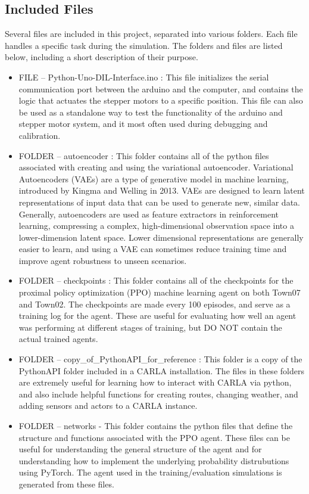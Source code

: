 \documentclass[12pt,oneside,letterpaper]{article}
\begin{document}
\subsection{Included Files}
Several files are included in this project, separated into various folders. Each file handles a specific task during the simulation. The folders and files are listed below, including a short description of their purpose.
\begin{itemize}
\item FILE -- Python-Uno-DIL-Interface.ino : This file initializes the serial communication port between the arduino and the computer, and contains the logic that actuates the stepper motors to a specific position. This file can also be used as a standalone way to test the functionality of the arduino and stepper motor system, and it most often used during debugging and calibration.
\item FOLDER -- autoencoder : This folder contains all of the python files associated with creating and using the variational autoencoder. Variational Autoencoders (VAEs) are a type of generative model in machine learning, introduced by Kingma and Welling in 2013. VAEs are designed to learn latent representations of input data that can be used to generate new, similar data. Generally, autoencoders are used as feature extractors in reinforcement learning, compressing a complex, high-dimensional observation space into a lower-dimension latent space. Lower dimensional representations are generally easier to learn, and using a VAE can sometimes reduce training time and improve agent robustness to unseen scenarios.
\item FOLDER -- checkpoints : This folder contains all of the checkpoints for the proximal policy optimization (PPO) machine learning agent on both Town07 and Town02. The checkpoints are made every 100 episodes, and serve as a training log for the agent. These are useful for evaluating how well an agent was performing at different stages of training, but DO NOT contain the actual trained agents.
\item FOLDER -- copy\_of\_PythonAPI\_for\_reference : This folder is a copy of the PythonAPI folder included in a CARLA installation. The files in these folders are extremely useful for learning how to interact with CARLA via python, and also include helpful functions for creating routes, changing weather, and adding sensors and actors to a CARLA instance. 
\item FOLDER -- networks - This folder contains the python files that define the structure and functions associated with the PPO agent. These files can be useful for understanding the general structure of the agent and for understanding how to implement the underlying probability distrubutions using PyTorch. The agent used in the training/evaluation simulations is generated from these files.

\end{itemize}
\end{document}
